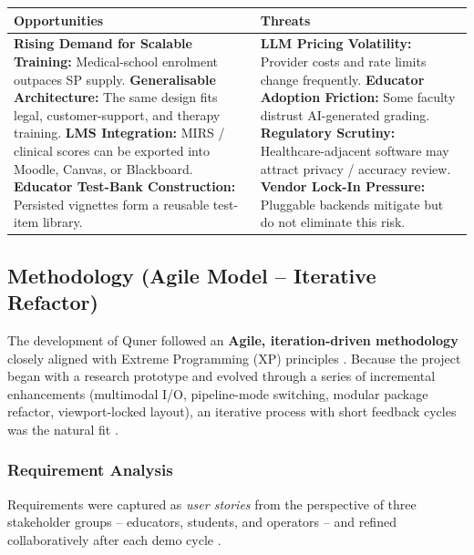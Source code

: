 \documentclass{article}
\begin{document}
\begin{table}[H]
\begin{tabular}{|p{7cm}|p{7cm}|}
\textbf{\vspace{1mm}Opportunities\vspace{1mm}} & \textbf{\vspace{1mm}Threats\vspace{1mm}} \\ \hline
\textbf{Rising Demand for Scalable Training:} Medical-school enrolment outpaces SP supply. \newline
\textbf{Generalisable Architecture:} The same design fits legal, customer-support, and therapy training. \newline
\textbf{LMS Integration:} MIRS / clinical scores can be exported into Moodle, Canvas, or Blackboard. \newline
\textbf{Educator Test-Bank Construction:} Persisted vignettes form a reusable test-item library.
&
\textbf{LLM Pricing Volatility:} Provider costs and rate limits change frequently. \newline
\textbf{Educator Adoption Friction:} Some faculty distrust AI-generated grading. \newline
\textbf{Regulatory Scrutiny:} Healthcare-adjacent software may attract privacy / accuracy review. \newline
\textbf{Vendor Lock-In Pressure:} Pluggable backends mitigate but do not eliminate this risk.
\\ \hline
\end{tabular}
\end{table}
\newpage

\subsection{Methodology (Agile Model -- Iterative Refactor)}

The development of Quner followed an \textbf{Agile, iteration-driven methodology} closely aligned with Extreme Programming (XP) principles \cite{Portovaras2024CurrentTA}. Because the project began with a research prototype and evolved through a series of incremental enhancements (multimodal I/O, pipeline-mode switching, modular package refactor, viewport-locked layout), an iterative process with short feedback cycles was the natural fit \cite{Topsakal2023CreatingLL}.

\subsubsection{Requirement Analysis}
Requirements were captured as \emph{user stories} from the perspective of three stakeholder groups -- educators, students, and operators -- and refined collaboratively after each demo cycle \cite{Azzara2023PeranPP}.
\end{document}
